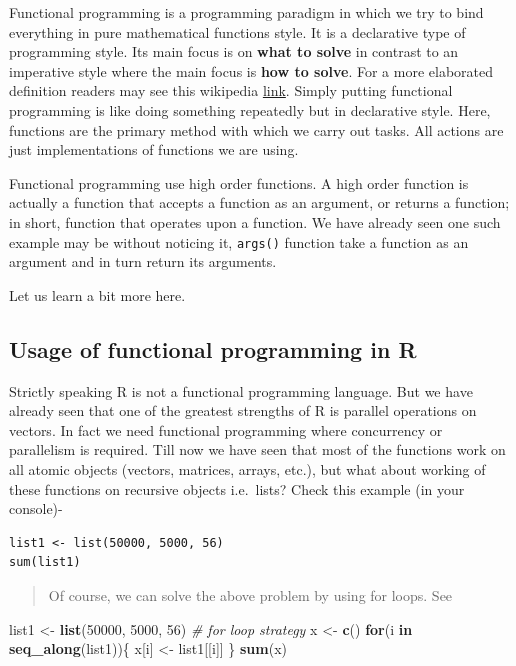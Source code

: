 \documentclass[
]{book}
\newenvironment{Shaded}{\begin{snugshade}}{\end{snugshade}}
\newcommand{\CommentTok}[1]{\textcolor[rgb]{0.56,0.35,0.01}{\textit{#1}}}
\newcommand{\ControlFlowTok}[1]{\textcolor[rgb]{0.13,0.29,0.53}{\textbf{#1}}}
\newcommand{\DecValTok}[1]{\textcolor[rgb]{0.00,0.00,0.81}{#1}}
\newcommand{\FunctionTok}[1]{\textcolor[rgb]{0.13,0.29,0.53}{\textbf{#1}}}
\newcommand{\NormalTok}[1]{#1}
\newcommand{\OtherTok}[1]{\textcolor[rgb]{0.56,0.35,0.01}{#1}}
\begin{document}
Functional programming is a programming paradigm in which we try to bind everything in pure mathematical functions style. It is a declarative type of programming style. Its main focus is on \textbf{what to solve} in contrast to an imperative style where the main focus is \textbf{how to solve}. For a more elaborated definition readers may see this wikipedia \href{https://en.wikipedia.org/wiki/Functional_programming}{link}. Simply putting functional programming is like doing something repeatedly but in declarative style. Here, functions are the primary method with which we carry out tasks. All actions are just implementations of functions we are using.

Functional programming use high order functions. A high order function is actually a function that accepts a function as an argument, or returns a function; in short, function that operates upon a function. We have already seen one such example may be without noticing it, \texttt{args()} function take a function as an argument and in turn return its arguments.

Let us learn a bit more here.

\hypertarget{usage-of-functional-programming-in-r}{%
\subsection{Usage of functional programming in R}\label{usage-of-functional-programming-in-r}}

Strictly speaking R is not a functional programming language. But we have already seen that one of the greatest strengths of R is parallel operations on vectors. In fact we need functional programming where concurrency or parallelism is required. Till now we have seen that most of the functions work on all atomic objects (vectors, matrices, arrays, etc.), but what about working of these functions on recursive objects i.e.~lists? Check this example (in your console)-

\begin{verbatim}
list1 <- list(50000, 5000, 56)
sum(list1)
\end{verbatim}

\begin{quote}
Of course, we can solve the above problem by using for loops. See
\end{quote}

\begin{Shaded}
\begin{Highlighting}[]
\NormalTok{list1 }\OtherTok{\textless{}{-}} \FunctionTok{list}\NormalTok{(}\DecValTok{50000}\NormalTok{, }\DecValTok{5000}\NormalTok{, }\DecValTok{56}\NormalTok{)}
\CommentTok{\# for loop strategy}
\NormalTok{x }\OtherTok{\textless{}{-}} \FunctionTok{c}\NormalTok{()}
\ControlFlowTok{for}\NormalTok{(i }\ControlFlowTok{in} \FunctionTok{seq\_along}\NormalTok{(list1))\{}
\NormalTok{  x[i] }\OtherTok{\textless{}{-}}\NormalTok{ list1[[i]]}
\NormalTok{\}}
\FunctionTok{sum}\NormalTok{(x)}
\end{Highlighting}
\end{Shaded}
\end{document}
